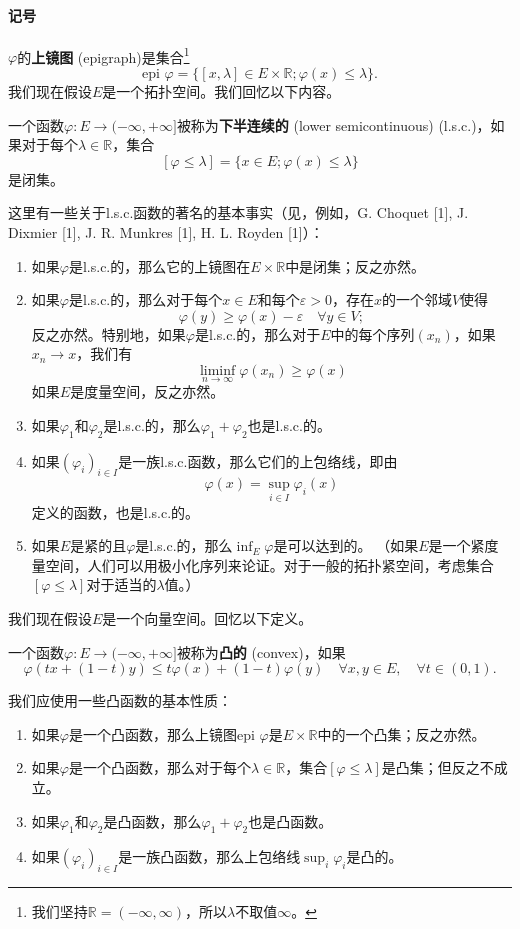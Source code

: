 \paragraph{记号} $\varphi$的\textbf{上镜图} (epigraph)是集合\footnote{我们坚持$\mathbb{R} = (-\infty, \infty)$，所以$\lambda$不取值$\infty$。}
\[ \text{epi } \varphi = \{[x, \lambda] \in E \times \mathbb{R}; \varphi(x) \leq \lambda\}. \]
我们现在假设$E$是一个拓扑空间。我们回忆以下内容。
\begin{definition}
一个函数$\varphi: E \to (-\infty, +\infty]$被称为\textbf{下半连续的} (lower semicontinuous) (l.s.c.)，如果对于每个$\lambda \in \mathbb{R}$，集合
\[ [\varphi \leq \lambda] = \{x \in E; \varphi(x) \leq \lambda\} \]
是闭集。
\end{definition}
这里有一些关于l.s.c.函数的著名的基本事实（见，例如，G. Choquet [1], J. Dixmier [1], J. R. Munkres [1], H. L. Royden [1]）：
\begin{enumerate}
    \item 如果$\varphi$是l.s.c.的，那么它的上镜图在$E \times \mathbb{R}$中是闭集；反之亦然。
    \item 如果$\varphi$是l.s.c.的，那么对于每个$x \in E$和每个$\varepsilon > 0$，存在$x$的一个邻域$V$使得
    \[ \varphi(y) \geq \varphi(x) - \varepsilon \quad \forall y \in V; \]
    反之亦然。特别地，如果$\varphi$是l.s.c.的，那么对于$E$中的每个序列$(x_n)$，如果$x_n \to x$，我们有
    \[ \liminf_{n\to\infty} \varphi(x_n) \geq \varphi(x) \]
    如果$E$是度量空间，反之亦然。
    \item 如果$\varphi_1$和$\varphi_2$是l.s.c.的，那么$\varphi_1 + \varphi_2$也是l.s.c.的。
    \item 如果$(\varphi_i)_{i \in I}$是一族l.s.c.函数，那么它们的上包络线，即由
    \[ \varphi(x) = \sup_{i \in I} \varphi_i(x) \]
    定义的函数，也是l.s.c.的。
    \item 如果$E$是紧的且$\varphi$是l.s.c.的，那么$\inf_E \varphi$是可以达到的。
    （如果$E$是一个紧度量空间，人们可以用极小化序列来论证。对于一般的拓扑紧空间，考虑集合$[\varphi \leq \lambda]$对于适当的$\lambda$值。）
\end{enumerate}
我们现在假设$E$是一个向量空间。回忆以下定义。
\begin{definition}
一个函数$\varphi: E \to (-\infty, +\infty]$被称为\textbf{凸的} (convex)，如果
\[ \varphi(tx+(1-t)y) \leq t\varphi(x) + (1-t)\varphi(y) \quad \forall x, y \in E, \quad \forall t \in (0, 1). \]
\end{definition}
我们应使用一些凸函数的基本性质：
\begin{enumerate}
    \item 如果$\varphi$是一个凸函数，那么上镜图$\text{epi } \varphi$是$E \times \mathbb{R}$中的一个凸集；反之亦然。
    \item 如果$\varphi$是一个凸函数，那么对于每个$\lambda \in \mathbb{R}$，集合$[\varphi \leq \lambda]$是凸集；但反之不成立。
    \item 如果$\varphi_1$和$\varphi_2$是凸函数，那么$\varphi_1 + \varphi_2$也是凸函数。
    \item 如果$(\varphi_i)_{i \in I}$是一族凸函数，那么上包络线$\sup_i \varphi_i$是凸的。
\end{enumerate}
